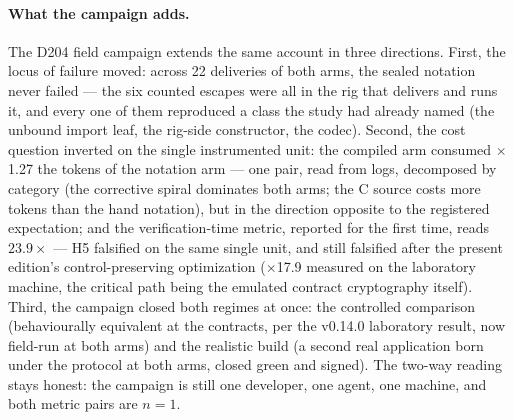 \documentclass[10pt,a4paper]{article}
\begin{document}
\paragraph{What the campaign adds.}
The D204 field campaign extends the same account in three directions.
First, the locus of failure moved: across 22 deliveries of both arms,
the sealed notation never failed --- the six counted escapes were all
in the rig that delivers and runs it, and every one of them reproduced
a class the study had already named (the unbound import leaf, the
rig-side constructor, the codec). Second, the cost question inverted
on the single instrumented unit: the compiled arm consumed
$\times$1.27 the tokens of the notation arm --- one pair, read from
logs, decomposed by category (the corrective spiral dominates both
arms; the C source costs more tokens than the hand notation), but in
the direction opposite to the registered expectation;
and the verification-time metric, reported for the first time, reads
$23.9\times$ --- H5 falsified on the same single unit, and still
falsified after the present edition's control-preserving optimization
($\times$17.9 measured on the laboratory machine, the critical path
being the emulated contract cryptography itself). Third, the
campaign closed both regimes at once: the controlled comparison
(behaviourally equivalent at the contracts, per the v0.14.0
laboratory result, now field-run at both arms) and the realistic
build (a second real application born under the protocol at both
arms, closed green and signed). The two-way reading stays honest: the
campaign is still one developer, one agent, one machine, and both
metric pairs are $n{=}1$.
\end{document}
